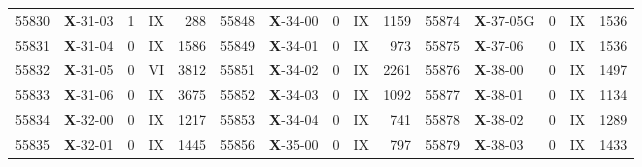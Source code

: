 \begin{table*}
\begin{tabular}{llllrllllrllllr}
55830&\textbf{X}-31-03&1&IX&288&55848&\textbf{X}-34-00&0&IX&1159&55874&\textbf{X}-37-05G&0&IX&1536\\
55831&\textbf{X}-31-04&0&IX&1586&55849&\textbf{X}-34-01&0&IX&973&55875&\textbf{X}-37-06&0&IX&1536\\
55832&\textbf{X}-31-05&0&VI&3812&55851&\textbf{X}-34-02&0&IX&2261&55876&\textbf{X}-38-00&0&IX&1497\\
55833&\textbf{X}-31-06&0&IX&3675&55852&\textbf{X}-34-03&0&IX&1092&55877&\textbf{X}-38-01&0&IX&1134\\
55834&\textbf{X}-32-00&0&IX&1217&55853&\textbf{X}-34-04&0&IX&741&55878&\textbf{X}-38-02&0&IX&1289\\
55835&\textbf{X}-32-01&0&IX&1445&55856&\textbf{X}-35-00&0&IX&797&55879&\textbf{X}-38-03&0&IX&1433\\
\hline
\hline
\end{tabular}
\end{table*}
